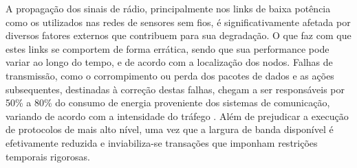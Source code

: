 \documentclass[
	12pt,				%
	openright,			%
	oneside,
	a4paper,			%
	english,			%
	french,				%
	spanish,			%
	brazil				%
	]{abntex2}
\begin{document}
A propagação dos sinais de rádio, principalmente nos links de baixa potência como os utilizados nas redes de sensores sem fios, é significativamente afetada por diversos fatores externos que contribuem para sua degradação. O que faz com que estes links se comportem de forma errática, sendo que sua performance pode variar ao longo do tempo, e de acordo com a localização dos nodos. Falhas de transmissão, como o corrompimento ou perda dos pacotes de dados e as ações subsequentes, destinadas à correção destas falhas, chegam a ser responsáveis por 50\% a 80\% do consumo de energia proveniente dos sistemas de comunicação, variando de acordo com a intensidade do tráfego \cite{Srinivasan2006}. Além de prejudicar a execução de protocolos de mais alto nível, uma vez que a largura de banda disponível é efetivamente reduzida e inviabiliza-se transações que imponham restrições temporais rigorosas.
\end{document}
